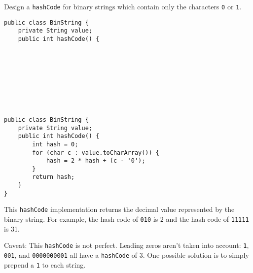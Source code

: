 \question Design a \texttt{hashCode} for binary strings which contain only the characters \texttt{0} or \texttt{1}.

\ifprintanswers
\else
\begin{lstlisting}
public class BinString {
    private String value;
    public int hashCode() {









\end{lstlisting}
\fi

\begin{solution}
\begin{lstlisting}
public class BinString {
    private String value;
    public int hashCode() {
        int hash = 0;
        for (char c : value.toCharArray()) {
            hash = 2 * hash + (c - '0');
        }
        return hash;
    }
}
\end{lstlisting}

This \texttt{hashCode} implementation returns the decimal value represented by the binary string.
For example, the hash code of \texttt{010} is 2 and the hash code of \texttt{11111} is 31.

Caveat: This \texttt{hashCode} is not perfect.
Leading zeros aren't taken into account: \texttt{1}, \texttt{001}, and \texttt{0000000001} all have a \texttt{hashCode} of 3.
One possible solution is to simply prepend a \texttt{1} to each string.
\end{solution}